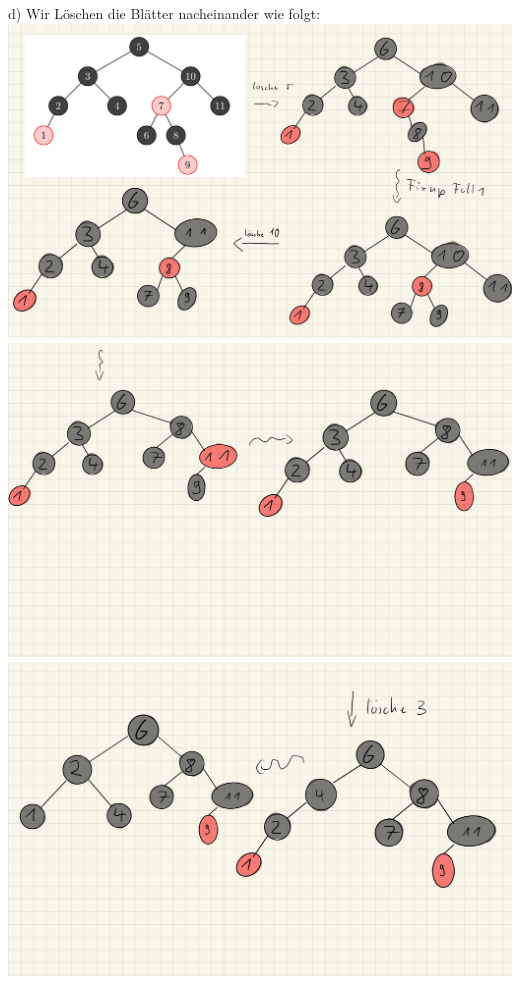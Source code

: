 \documentclass{article}
\begin{document}
\noindent d) 
Wir Löschen die Blätter nacheinander wie folgt: \\ 
\includegraphics[scale=0.15]{ h1_a13 } \\ 
\includegraphics[scale=0.15]{ h1_a14 } \\  
\includegraphics[scale=0.15]{ h1_a14a } 
\end{document}
